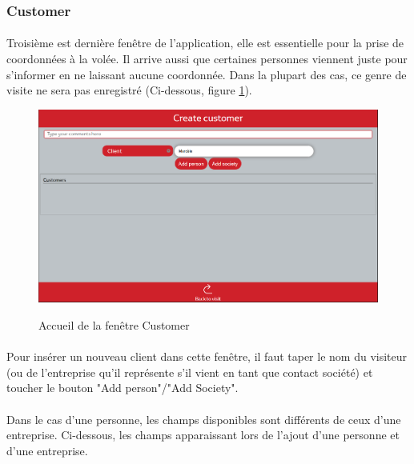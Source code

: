 \documentclass[12pt]{report}
\begin{document}
\subsubsection*{Customer}
\paragraph{}
Troisième est dernière fenêtre de l'application, elle est essentielle pour la prise de coordonnées à la volée.
Il arrive aussi que certaines personnes viennent juste pour s'informer en ne laissant aucune coordonnée. Dans la plupart des cas, ce genre de visite ne sera pas enregistré (Ci-dessous, figure \ref{image_customer_3}).

\begin{figure}[H]
	\caption{Accueil de la fenêtre Customer}
	\includegraphics[width=\linewidth]{img/image_customer_3}
	\label{image_customer_3}
\end{figure}

\paragraph{}
Pour insérer un nouveau client dans cette fenêtre, il faut taper le nom du visiteur (ou de l'entreprise qu'il représente s'il vient en tant que contact société) et toucher le bouton "Add person"/"Add Society".
\paragraph{}
Dans le cas d'une personne, les champs disponibles sont différents de ceux d'une entreprise. Ci-dessous, les champs apparaissant lors de l'ajout d'une personne et d'une entreprise.
\end{document}
